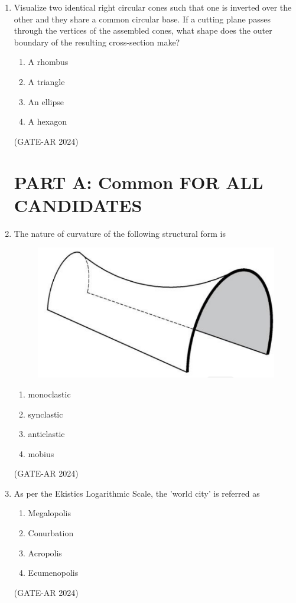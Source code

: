 \documentclass[a4paper,10pt]{article}
\begin{document}
\begin{enumerate}
    \item Visualize two identical right circular cones such that one is inverted over the other and they share a common circular base. If a cutting plane passes through the vertices of the assembled cones, what shape does the outer boundary of the resulting cross-section make?
    \begin{multicols}{4}
    \begin{enumerate}
        \item A rhombus
        \item A triangle
        \item An ellipse
        \item A hexagon
    \end{enumerate}
    \end{multicols}
    \hfill (GATE-AR 2024)

\section*{PART A: Common FOR ALL CANDIDATES}

    \item The nature of curvature of the following structural form is
    \begin{figure}[h!]
    \centering
    \includegraphics[width=0.5\columnwidth]{figs/08.jpg}
    \caption{}
    \label{fig:Img08}
    \end{figure}
    \begin{multicols}{4}
    \begin{enumerate}
        \item monoclastic
        \item synclastic
        \item anticlastic
        \item mobius
    \end{enumerate}
    \end{multicols}
    \hfill (GATE-AR 2024)

    \item As per the Ekistics Logarithmic Scale, the 'world city' is referred as
    \begin{multicols}{4}
    \begin{enumerate}
        \item Megalopolis
        \item Conurbation
        \item Acropolis
        \item Ecumenopolis
    \end{enumerate}
    \end{multicols}
    \hfill (GATE-AR 2024)


\end{enumerate}
\end{document}
